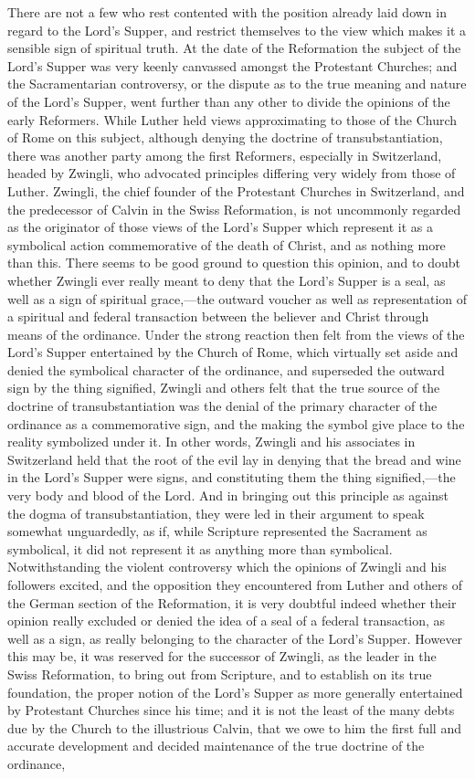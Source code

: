 \documentclass[]{book}
\begin{document}
There are not a few who rest contented with the position already laid down in regard to the Lord's Supper, and restrict themselves to the view which makes it a sensible sign of spiritual truth. At the date of the Reformation the subject of the Lord's Supper was very keenly canvassed amongst the Protestant Churches; and the Sacramentarian controversy, or the dispute as to the true meaning and nature of the Lord's Supper, went further than any other to divide the opinions of the early Reformers. While Luther held views approximating to those of the Church of Rome on this subject, although denying the doctrine of transubstantiation, there was another party among the first Reformers, especially in Switzerland, headed by Zwingli, who advocated principles differing very widely from those of Luther. Zwingli, the chief founder of the Protestant Churches in Switzerland, and the predecessor of Calvin in the Swiss Reformation, is not uncommonly regarded as the originator of those views of the Lord's Supper which represent it as a symbolical action commemorative of the death of Christ, and as nothing more than this. There seems to be good ground to question this opinion, and to doubt whether Zwingli ever really meant to deny that the Lord's Supper is a seal, as well as a sign of spiritual grace,---the outward voucher as well as representation of a spiritual and federal transaction between the believer and Christ through means of the ordinance. Under the strong reaction then felt from the views of the Lord's Supper entertained by the Church of Rome, which virtually set aside and denied the symbolical character of the ordinance, and superseded the outward sign by the thing signified, Zwingli and others felt that the true source of the doctrine of transubstantiation was the denial of the primary character of the ordinance as a commemorative sign, and the making the symbol give place to the reality symbolized under it. In other words, Zwingli and his associates in Switzerland held that the root of the evil lay in denying that the bread and wine in the Lord's Supper were signs, and constituting them the thing signified,---the very body and blood of the Lord. And in bringing out this principle as against the dogma of transubstantiation, they were led in their argument to speak somewhat unguardedly, as if, while Scripture represented the Sacrament as symbolical, it did not represent it as anything more than symbolical. Notwithstanding the violent controversy which the opinions of Zwingli and his followers excited, and the opposition they encountered from Luther and others of the German section of the Reformation, it is very doubtful indeed whether their opinion really excluded or denied the idea of a seal of a federal transaction, as well as a sign, as really belonging to the character of the Lord's Supper. However this may be, it was reserved for the successor of Zwingli, as the leader in the Swiss Reformation, to bring out from Scripture, and to establish on its true foundation, the proper notion of the Lord's Supper as more generally entertained by Protestant Churches since his time; and it is not the least of the many debts due by the Church to the illustrious Calvin, that we owe to him the first full and accurate development and decided maintenance of the true doctrine of the ordinance, 
\end{document}
